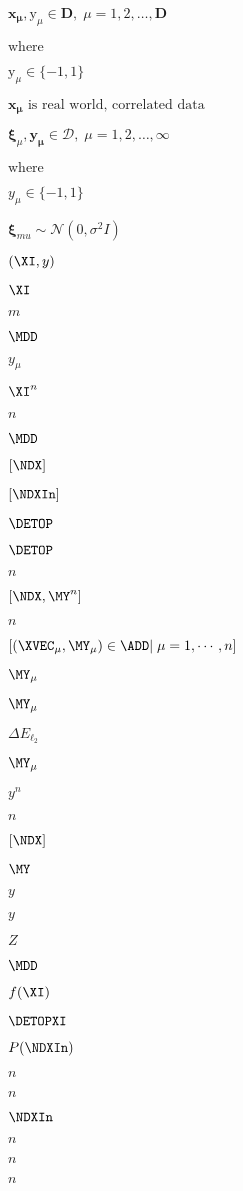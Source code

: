 
$\mathbf{x_\mu}, \mathrm{y}_\mu \in \mathbf{D},\;\mu=1, 2, \ldots, \mathbf{D}$

$\text{where }$

$\mathrm{y}_\mu \in \{-1, 1\}$

$\mathbf{x_\mu}\text{ is real world, correlated data }$

$\boldsymbol{\xi}_\mu, \mathbf{y_\mu} \in \mathbf{\mathcal{D}},\;\mu=1, 2, \ldots, \infty$

$\text{where }$

$y_\mu \in \{-1, 1\}$

$\boldsymbol{\xi}_{mu} \sim \mathcal{N}(0, \sigma^2 I)$

$(\XI,y)$

$\XI$

$m$

$\MDD$

$y_{\mu}$

$\XI^{n}$

$n$

$\MDD$

$[\NDX]$

$[\NDXIn]$

$\DETOP$

$\DETOP$

$n$

$[\NDX, \MY^{n}]$

$n$

$[(\XVEC_{\mu},\MY_{\mu})\in\ADD|\;\mu=1,\cdots,n]$

$\MY_{\mu}$

$\MY_{\mu}$

$\Delta E_{\ell_2}$

$\MY_{\mu}$

$y^{n}$

$n$

$[\NDX]$

$\MY$

$y$

$y$

$Z$

$\MDD$

$f(\XI)$

$\DETOPXI$

$P(\NDXIn)$

$n$

$n$

$\NDXIn$

$n$

$n$

$n$

